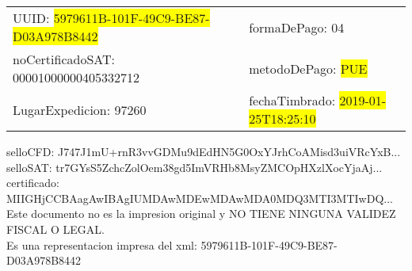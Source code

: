 \documentclass{article}
\begin{document}
\begin{tabular}{p{11cm}p{1cm}p{8cm}}
\bigskip
UUID: \colorbox{yellow}{ 5979611B-101F-49C9-BE87-D03A978B8442 } & & formaDePago: 04\\

noCertificadoSAT: 00001000000405332712 & & metodoDePago: \colorbox{yellow}{ PUE }\\

LugarExpedicion: 97260 & & fechaTimbrado: \colorbox{yellow}{ 2019-01-25T18:25:10 } \\
\end{tabular}

\bigskip
selloCFD: J747J1mU+rnR3vvGDMu9dEdHN5G0OxYJrhCoAMisd3uiVRcYxB... \\
selloSAT: tr7GYsS5ZchcZolOem38gd5ImVRHb8MsyZMCOpHXzlXocYjaAj... \\

certificado: MIIGHjCCBAagAwIBAgIUMDAwMDEwMDAwMDA0MDQ3MTI3MTIwDQ...\bigskip\bigskip\bigskip\bigskip\bigskip\bigskip
\\Este documento no es la impresion original y NO TIENE NINGUNA VALIDEZ FISCAL O LEGAL. \\
 Es una representacion impresa del xml:  5979611B-101F-49C9-BE87-D03A978B8442 \\
\end{document}

